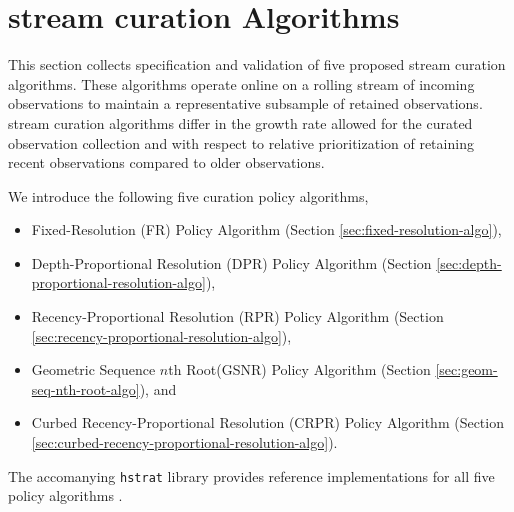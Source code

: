 \section{stream curation Algorithms} \label{sec:annotation-algorithms}



This section collects specification and validation of five proposed stream curation algorithms.
These algorithms operate online on a rolling stream of incoming observations to maintain a representative subsample of retained observations.
stream curation algorithms differ in the growth rate allowed for the curated observation collection and with respect to relative prioritization of retaining recent observations compared to older observations.


We introduce the following five curation policy algorithms,
\begin{itemize}
\item Fixed-Resolution (FR) Policy Algorithm (Section \ref{sec:fixed-resolution-algo}),
\item Depth-Proportional Resolution (DPR) Policy Algorithm (Section \ref{sec:depth-proportional-resolution-algo}),
\item Recency-Proportional Resolution (RPR) Policy Algorithm (Section \ref{sec:recency-proportional-resolution-algo}),
\item Geometric Sequence $n$th Root(GSNR) Policy Algorithm (Section \ref{sec:geom-seq-nth-root-algo}), and
\item Curbed Recency-Proportional Resolution (CRPR) Policy Algorithm (Section \ref{sec:curbed-recency-proportional-resolution-algo}).
\end{itemize}
The accomanying \texttt{hstrat} library provides reference implementations for all five policy algorithms \citep{moreno2022hstrat}.

